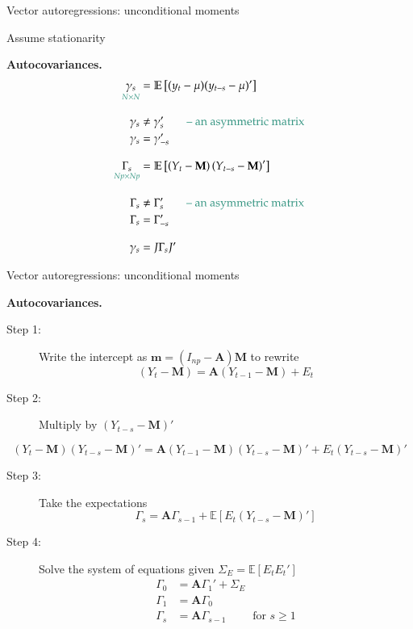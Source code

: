 \documentclass[notes,blackandwhite,mathsans,usenames,dvipsnames]{beamer}
\begin{document}
\begin{frame}{Vector autoregressions: unconditional moments}

{\color{mcxs2}Assume stationarity}

\bigskip\textbf{Autocovariances.}
\begin{align*}
\underset{\color{mcxs2}N\times N}{\gamma_s} &= \mathbb{E}\left[(y_t - \mu)(y_{t-s} - \mu)'\right]\\[2ex]
\gamma_s &\neq \gamma_s' \qquad\text{\color{mcxs2}-- an asymmetric matrix}\\
\gamma_s &= \gamma_{-s}' \\[2ex]
\underset{\color{mcxs2}Np\times Np}{\Gamma_s} &= \mathbb{E}\left[\left(Y_t - \mathbf{M}\right)\left(Y_{t-s} - \mathbf{M}\right)'\right]\\[2ex]
\Gamma_s &\neq \Gamma_s' \qquad\text{\color{mcxs2}-- an asymmetric matrix}\\
\Gamma_s &= \Gamma_{-s}' \\[2ex]
\gamma_s &= J\Gamma_s J' 
\end{align*}

\end{frame}





\begin{frame}{Vector autoregressions: unconditional moments }
\small

\textbf{Autocovariances.}
\begin{description}
\item[Step 1:] {\color{purple}Write} {\color{mcxs2}the intercept as} $\mathbf{m} = \left(I_{np} - \mathbf{A}\right)\mathbf{M}$ {\color{mcxs2}to rewrite}
$$ \left(Y_t - \mathbf{M}\right) = \mathbf{A}\left(Y_{t-1} - \mathbf{M}\right) + E_t $$ 
\item[Step 2:] {\color{mcxs1}Multiply} {\color{mcxs2}by} $\left(Y_{t-s} - \mathbf{M}\right)'$
\end{description}
$$ \left(Y_t - \mathbf{M}\right)\left(Y_{t-s} - \mathbf{M}\right)' = \mathbf{A}\left(Y_{t-1} - \mathbf{M}\right)\left(Y_{t-s} - \mathbf{M}\right)' + E_t\left(Y_{t-s} - \mathbf{M}\right)' $$ 
\begin{description}
\item[Step 3:] {\color{mcxs2}Take the expectations}
$$ \Gamma_s = \mathbf{A}\Gamma_{s-1} + \mathbb{E}\left[E_t\left(Y_{t-s} - \mathbf{M}\right)' \right] $$ 
\item[Step 4:] {\color{purple}Solve} {\color{mcxs2}the system of equations given}  $\Sigma_E = \mathbb{E}[E_t E_t']$
\begin{align*}
\Gamma_0 &= \mathbf{A}\Gamma_1' + \Sigma_E\\
\Gamma_1 &= \mathbf{A}\Gamma_0\\[2ex]
\Gamma_s &= \mathbf{A}\Gamma_{s-1} \qquad\text{ for }s\geq1
\end{align*}
\end{description}
\end{frame}
\end{document}
